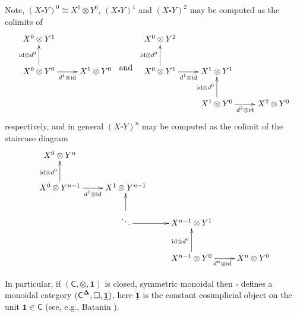 \begin{remark}Note, $(X\square Y)^0\cong X^0\otimes Y^0$, $(X\square Y)^{1}$ and $(X\square Y)^{2}$ may be computed as the colimits of \[ \xymatrix{ X^0 \otimes Y^1 & \\ X^0 \otimes Y^0 \ar[r]_-{d^1\otimes \id} \ar[u]^-{\id \otimes d^0} & X^1 \otimes Y^0} \; \raisebox{-8ex}{\text{ and }}  \; \xymatrix{ 
    X^0 \otimes Y^2 & &
    \\ 
    X^0 \otimes Y^1 \ar[r]_-{d^1\otimes \id} \ar[u]^-{\id \otimes d^0} 
    & 
    X^1 \otimes Y^1 & \\
    & X^1 \otimes Y^0 \ar[u]^-{\id \otimes d^0} \ar[r]_-{d^2\otimes \id} 
    &
    X^2 \otimes Y^0}
    \] respectively, and in general $(X\square Y)^n$ may be computed as the colimit of the staircase diagram \begin{equation}\xymatrix{
    X^0 \otimes Y^n & &\\
    X^0 \otimes Y^{n-1} \ar[r]_{d^1\otimes \id} \ar[u]^{\id\otimes d^0} & X^1 \otimes Y^{n-1} &\\
    & \ddots \ar[u] \ar[r]& X^{n-1}\otimes Y^1 &\\
    && X^{n-1}\otimes Y^0 \ar[u]^{\id\otimes d^0} \ar[r]_{d^n\otimes \id} &X^n\otimes Y^0 
}\end{equation}
\end{remark}

In particular, if $(\mathsf{C},\otimes, \mathbf{1})$ is closed, symmetric monoidal then $\square$ defines a monoidal category $(\textsf{C}^{\mathbf{\Delta}}, \square, \underline{\mathbf{1}})$, here $\underline{\mathbf{1}}$ is the constant cosimplicial object on the unit $\mathbf{1}\in\mathsf{C}$ (see, e.g.,  Batanin \cite{Bat-box}). %

